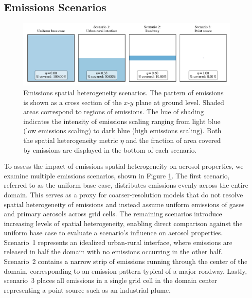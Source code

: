 \documentclass[journal abbreviation, manuscript]{copernicus}
\begin{document}
\subsection{Emissions Scenarios}

\begin{figure}[!t]
	\centering
	\includegraphics[]{figures/SH-scenarios.pdf}
	\caption{Emissions spatial heterogeneity scenarios. The
          pattern of emissions is shown as a cross section of the
          $x$-$y$ plane at ground level. Shaded areas correspond to
          regions of emissions. The hue of shading indicates the
          intensity of emissions scaling ranging from light blue (low
          emissions scaling) to dark blue (high emissions
          scaling). Both the spatial heterogeneity metric $\eta$ and
          the fraction of area covered by emissions are displayed in
          the bottom of each scenario.}
	\label{fig:sh-scenarios}
\end{figure} 

To assess the impact of emissions spatial heterogeneity on aerosol
properties, we examine multiple emissions scenarios, shown in Figure
\ref{fig:sh-scenarios}. The first scenario, referred to as the uniform
base case, distributes emissions evenly across the entire domain. This
serves as a proxy for coarser-resolution models that do not resolve
spatial heterogeneity of emissions and instead assume uniform
emissions of gases and primary aerosols across grid cells. The
remaining scenarios introduce increasing levels of spatial
heterogeneity, enabling direct comparison against the uniform base
case to evaluate a scenario's influence on aerosol properties. Scenario~1
represents an idealized urban-rural interface, where emissions are
released in half the domain with no emissions occurring in the other
half. Scenario~2 contains a narrow strip of emissions running through
the center of the domain, corresponding to an emission pattern typical
of a major roadway. Lastly, scenario~3 places all emissions in a
single grid cell in the domain center representing a point source such
as an industrial plume.
\end{document}
